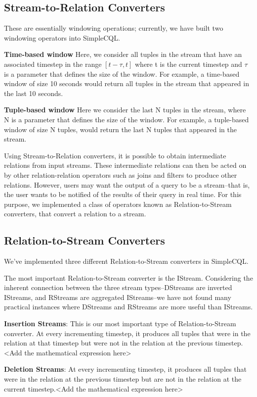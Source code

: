 \documentclass[a4paper, 10pt, conference]{IEEEconf}
\begin{document}
\subsection{Stream-to-Relation Converters}
These are essentially windowing operations; currently, we have built two windowing operators into SimpleCQL.

\textbf{Time-based window} Here, we consider all tuples in the stream that have an associated timestep in the range $[t-\tau, t]$ where t is the current timestep and $\tau$ is a parameter that defines the size of the window. For example, a time-based window of size 10 seconds would return all tuples in the stream that appeared in the last 10 seconds.

\textbf{Tuple-based window} Here we consider the last N tuples in the stream, where N is a parameter that defines the size of the window. For example, a tuple-based window of size N tuples, would return the last N tuples that appeared in the stream.

Using Stream-to-Relation converters, it is possible to obtain intermediate relations from input streams. These intermediate relations can then be acted on by other relation-relation operators such as joins and filters to produce other relations. However, users may want the output of a query to be a stream--that is, the user wants to be notified of the results of their query in real time. For this purpose, we implemented a class of operators known as Relation-to-Stream converters, that convert a relation to a stream.

\subsection{Relation-to-Stream Converters}
We’ve implemented three different Relation-to-Stream converters in SimpleCQL.

The most important Relation-to-Stream converter is the IStream. Considering the inherent connection between the three stream types--DStreams are inverted IStreams, and RStreams are aggregated IStreams--we have not found many practical instances where DStreams and RStreams are more useful than IStreams.


\textbf{Insertion Streams}: This is our most important type of Relation-to-Stream converter. At every incrementing timestep, it produces all tuples that were in the relation at that timestep but were not in the relation at the previous timestep.<Add the mathematical expression here>

\textbf{Deletion Streams}: At every incrementing timestep, it produces all tuples that were in the relation at the previous timestep but are not in the relation at the current timestep.<Add the mathematical expression here>
\end{document}

